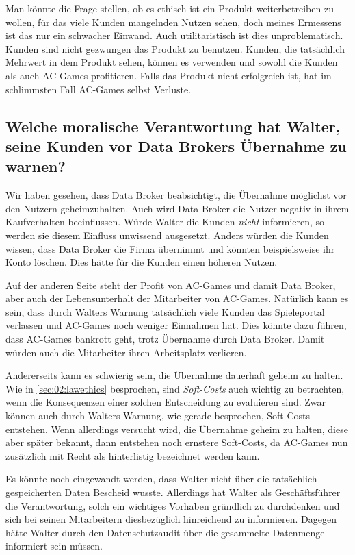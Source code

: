 Man könnte die Frage stellen, ob es ethisch ist ein Produkt weiterbetreiben zu wollen, für das viele Kunden mangelnden Nutzen sehen, doch meines Ermessens ist das nur ein schwacher Einwand. 
Auch utilitaristisch ist dies unproblematisch. Kunden sind nicht gezwungen das Produkt zu benutzen.
Kunden, die tatsächlich Mehrwert in dem Produkt sehen, können es verwenden und sowohl die Kunden als auch AC-Games profitieren.
Falls das Produkt nicht erfolgreich ist, hat im schlimmsten Fall AC-Games selbst Verluste.

\subsection*{Welche moralische Verantwortung hat Walter, seine Kunden vor Data Brokers Übernahme zu warnen? \cite{kees_faites_2017}}

Wir haben gesehen, dass Data Broker beabsichtigt, die Übernahme möglichst vor den Nutzern geheimzuhalten.
Auch wird Data Broker die Nutzer negativ in ihrem Kaufverhalten beeinflussen.
Würde Walter die Kunden \emph{nicht} informieren, so werden sie diesem Einfluss unwissend ausgesetzt.
Anders würden die Kunden wissen, dass Data Broker die Firma übernimmt und könnten beispielsweise ihr Konto löschen.
Dies hätte für die Kunden einen höheren Nutzen.

Auf der anderen Seite steht der Profit von AC-Games und damit Data Broker, aber auch der Lebensunterhalt der Mitarbeiter von AC-Games.
Natürlich kann es sein, dass durch Walters Warnung tatsächlich viele Kunden das Spieleportal verlassen und AC-Games noch weniger Einnahmen hat.
Dies könnte dazu führen, dass AC-Games bankrott geht, trotz Übernahme durch Data Broker.
Damit würden auch die Mitarbeiter ihren Arbeitsplatz verlieren. 

Andererseits kann es schwierig sein, die Übernahme dauerhaft geheim zu halten.
Wie in \cref{sec:02:lawethics} besprochen, sind \emph{Soft-Costs} auch wichtig zu betrachten, wenn die Konsequenzen einer solchen Entscheidung zu evaluieren sind.
Zwar können auch durch Walters Warnung, wie gerade besprochen, Soft-Costs entstehen.
Wenn allerdings versucht wird, die Übernahme geheim zu halten, diese aber später bekannt, dann entstehen noch ernstere Soft-Costs, da AC-Games nun zusätzlich mit Recht als hinterlistig bezeichnet werden kann.

Es könnte noch eingewandt werden, dass Walter nicht über die tatsächlich gespeicherten Daten Bescheid wusste.
Allerdings hat Walter als Geschäftsführer die Verantwortung, solch ein wichtiges Vorhaben gründlich zu durchdenken und sich bei seinen Mitarbeitern diesbezüglich hinreichend zu informieren.
Dagegen hätte Walter durch den Datenschutzaudit über die gesammelte Datenmenge informiert sein müssen.

